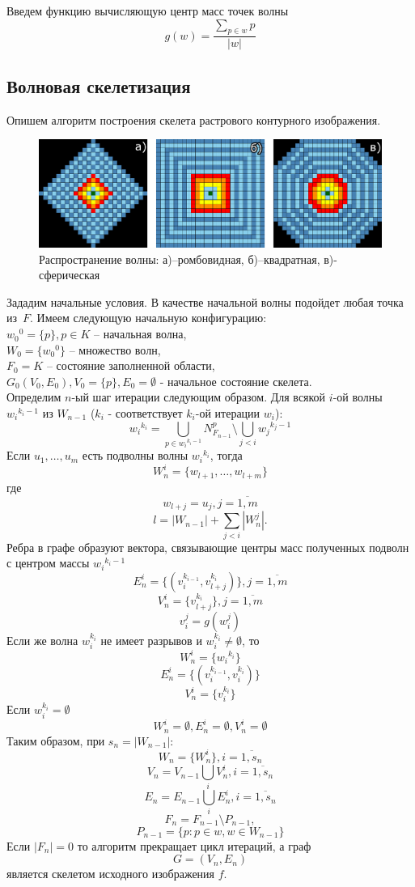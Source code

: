 Введем функцию вычисляющую центр масс точек волны 
$$g(w)=\dfrac{\sum\limits_{p\in w} p}{\lvert w\rvert}$$

\subsection{Волновая скелетизация}
Опишем алгоритм построения скелета растрового контурного изображения.

\begin{figure}[h]
\centering
\includegraphics[width=\linewidth,keepaspectratio]{images/th_wave}
\caption{Распространение волны: а)--ромбовидная, б)--квадратная, в)-сферическая }
\end{figure}

Зададим начальные условия. В качестве начальной волны подойдет любая точка из~$F$. 
Имеем следующую начальную конфигурацию:\\
${{w_0}^0} = \{p\}, p\in K$ -- начальная волна,\\
$W_0 = \{{w_0}^0\}$  -- множество волн,\\
$F_0 = K$ -- состояние заполненной области,\\
$G_0(V_0,E_0), V_0=\{p\}, E_0=\emptyset$ - начальное состояние скелета.\\

Определим $n$-ый шаг итерации следующим образом.
Для всякой $i$-ой волны ${w_i}^{k_i-1}$ из $W_{n-1}$ ($k_i$ - соответствует $k_i$-ой итерации $w_i$):
\begin{equation}
{w_i}^{k_i} = \bigcup_{p\in{w_i}^{k_i-1}}N_{F_{n-1}}^p\setminus\bigcup_{j<i}{w_j}^{k_j-1}
\label{skeleton1}
\end{equation}
Если $u_1,\ldots ,u_m$ есть подволны волны ${w_i}^{k_i}$, тогда
$$W^i_n=\{w_{l+1},\ldots ,w_{l+m}\}$$
где
$$w_{l+j}=u_j, j=\overline{1,m}$$
$$l = |W_{n-1}|+\sum\limits_{j<i}|W^j_n|.$$
Ребра в графе образуют вектора, связывающие центры масс полученных подволн с центром массы ${w_i}^{k_i-1}$
$$E^i_n=\{(v_{i}^{k_{i-1}}, v_{l+j}^{k_i})\}, j=\overline{1,m}$$
$$V^i_n=\{v_{l+j}^{k_i}\}, j=\overline{1,m}$$
$$v_i^j = g(w_i^j)$$
Если же волна $w_i^{k_i}$ не имеет разрывов и $w_i^{k_i}\neq\emptyset$, то
$$W^i_n=\{{w_i}^{k_i}\}$$
$$E^i_n=\{(v_{i}^{k_{i-1}}, v_{i}^{k_{i}})\}$$
$$V^i_n=\{v_{i}^{k_{i}}\}$$
Если $w_i^{k_i}=\emptyset$
$$W^i_n=\emptyset,E^i_n=\emptyset,V^i_n=\emptyset$$
Таким образом, при $s_n = |W_{n-1}|$:
$$W_{n} = \{W^i_n\}, i=\overline{1,s_n}$$
$$V_n = V_{n-1}\bigcup_i V^i_n, i=\overline{1,s_n}$$
$$E_n = E_{n-1}\bigcup_i{E^i_n}, i=\overline{1,s_n}$$
$$F_{n} = F_{n-1}\setminus P_{n-1},$$ 
$$P_{n-1} = \{p : p\in w, w \in W_{n-1}\}$$
Если $|F_{n}|=0$ то алгоритм прекращает цикл итераций, а граф
$$G = (V_n, E_n)$$
является скелетом исходного изображения $f$.\\

